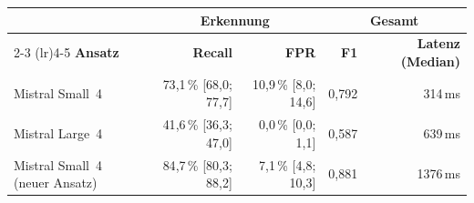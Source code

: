 \begin{tabular}{l rr rr}
\toprule
 & \multicolumn{2}{c}{\textbf{Erkennung}} & \multicolumn{2}{c}{\textbf{Gesamt}} \\
\cmidrule(lr){2-3} \cmidrule(lr){4-5}
\textbf{Ansatz} & \textbf{Recall} & \textbf{FPR} & \textbf{F1} & \textbf{Latenz (Median)} \\
\midrule
Mistral Small~4 & 73{,}1\,\% {\scriptsize\color{gray}[68{,}0; 77{,}7]} & 10{,}9\,\% {\scriptsize\color{gray}[8{,}0; 14{,}6]} & 0{,}792 & 314\,ms \\
Mistral Large~4 & 41{,}6\,\% {\scriptsize\color{gray}[36{,}3; 47{,}0]} & 0{,}0\,\% {\scriptsize\color{gray}[0{,}0; 1{,}1]} & 0{,}587 & 639\,ms \\
\rowcolor{hsmw!10}
Mistral Small~4 (neuer Ansatz) & 84{,}7\,\% {\scriptsize\color{gray}[80{,}3; 88{,}2]} & 7{,}1\,\% {\scriptsize\color{gray}[4{,}8; 10{,}3]} & 0{,}881 & 1376\,ms \\
\bottomrule
\end{tabular}
